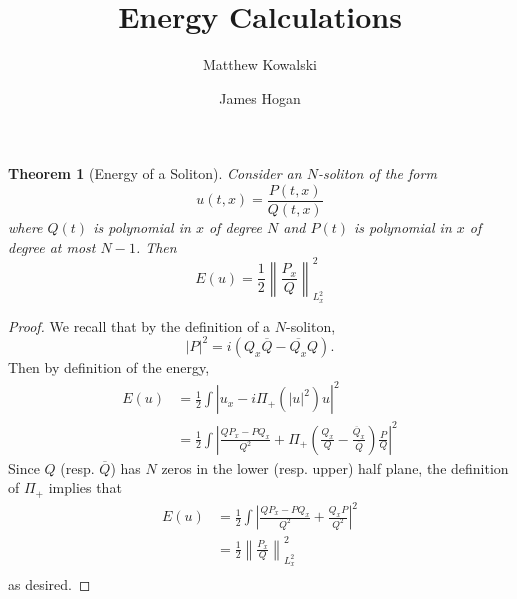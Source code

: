\documentclass{amsart}
\newtheorem{theorem}{Theorem}[section]
\theoremstyle{definition}
\renewcommand{\(}{\left(}
\renewcommand{\)}{\right)}
\begin{document}
\title{\bf Energy Calculations}

\author[M.~Kowalski]{Matthew Kowalski}
\address{Department of Mathematics, University of California, Los Angeles, CA 90095, USA}
\author[J.~Hogan]{James Hogan}
\address{Department of Mathematics, University of California, Los Angeles, CA 90095, USA}

\maketitle

\begin{theorem}[Energy of a Soliton]\label{energy of a soliton}
    Consider an $N$-soliton of the form
    \begin{equation*}
        u(t,x) = \frac{P(t,x)}{Q(t,x)}
    \end{equation*}
    where $Q(t)$ is polynomial in $x$ of degree $N$ and $P(t)$ is polynomial in $x$ of degree at most $N - 1$. Then
    \begin{equation*}
        E(u) = \frac{1}{2}\left\| \frac{P_x}{Q}\right\|_{L^2_x}^2
    \end{equation*}
\end{theorem}
\begin{proof}
    We recall that by the definition of a $N$-soliton,
    \begin{equation*}
        |P|^2 = i(Q_x \overline{Q} - \overline{Q_x}Q).
    \end{equation*}
    Then by definition of the energy,
    \begin{align*}
        E(u) & = \frac{1}{2} \int \left| u_x - i \Pi_+(|u|^2)u\right|^2 \\
        & = \frac{1}{2} \int \left| \frac{QP_x - PQ_x}{Q^2} + \Pi_+\(\frac{Q_x}{Q} - \frac{\overline{Q}_x}{\overline{Q}}\)\frac{P}{Q}\right|^2
    \end{align*}
    Since $Q$ (resp. $\overline{Q}$) has $N$ zeros in the lower (resp. upper) half plane, the definition of $\Pi_+$ implies that
    \begin{align*}
        E(u) & = \frac{1}{2} \int \left| \frac{QP_x - PQ_x}{Q^2} + \frac{Q_xP}{Q^2}\right|^2 \\
        & = \frac{1}{2} \left\|\frac{P_x}{Q}\right\|_{L_x^2}^2 \\
    \end{align*}
    as desired.
\end{proof}
\end{document}
